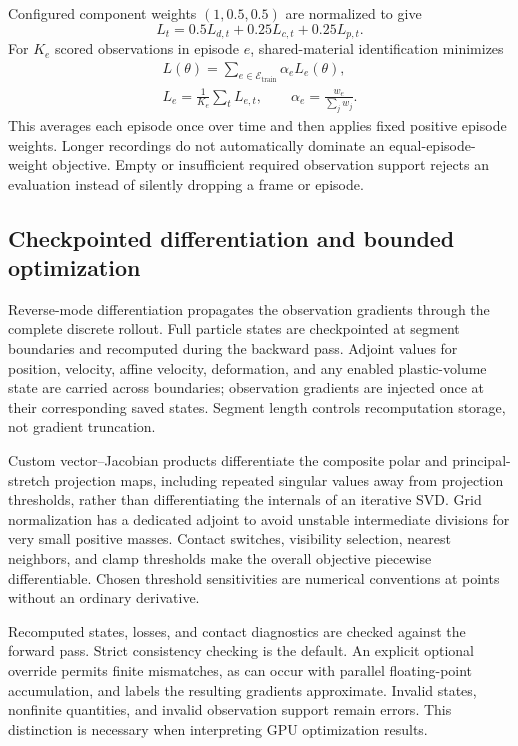 Configured component weights $(1,0.5,0.5)$ are normalized to give
\begin{equation}
 L_t=0.5L_{d,t}+0.25L_{c,t}+0.25L_{p,t}.
 \label{eq:frameloss}
\end{equation}
For $K_e$ scored observations in episode $e$, shared-material identification minimizes
\begin{equation}
 \begin{gathered}
 L(\theta)=\sum_{e\in\mathcal E_{\mathrm{train}}}\alpha_e L_e(\theta),\\
 L_e=\frac{1}{K_e}\sum_t L_{e,t},\qquad
 \alpha_e=\frac{w_e}{\sum_j w_j}.
 \end{gathered}
 \label{eq:datasetloss}
\end{equation}
This averages each episode once over time and then applies fixed positive episode weights. Longer recordings do not automatically dominate an equal-episode-weight objective. Empty or insufficient required observation support rejects an evaluation instead of silently dropping a frame or episode.

\subsection{Checkpointed differentiation and bounded optimization}

Reverse-mode differentiation propagates the observation gradients through the complete discrete rollout. Full particle states are checkpointed at segment boundaries and recomputed during the backward pass. Adjoint values for position, velocity, affine velocity, deformation, and any enabled plastic-volume state are carried across boundaries; observation gradients are injected once at their corresponding saved states. Segment length controls recomputation storage, not gradient truncation.

Custom vector--Jacobian products differentiate the composite polar and principal-stretch projection maps, including repeated singular values away from projection thresholds, rather than differentiating the internals of an iterative SVD. Grid normalization has a dedicated adjoint to avoid unstable intermediate divisions for very small positive masses. Contact switches, visibility selection, nearest neighbors, and clamp thresholds make the overall objective piecewise differentiable. Chosen threshold sensitivities are numerical conventions at points without an ordinary derivative.

Recomputed states, losses, and contact diagnostics are checked against the forward pass. Strict consistency checking is the default. An explicit optional override permits finite mismatches, as can occur with parallel floating-point accumulation, and labels the resulting gradients approximate. Invalid states, nonfinite quantities, and invalid observation support remain errors. This distinction is necessary when interpreting GPU optimization results.

